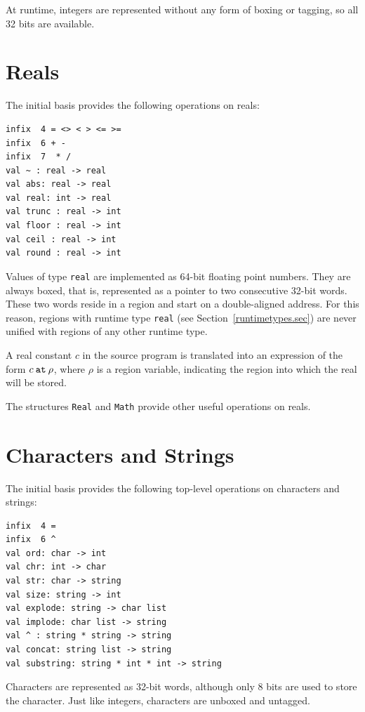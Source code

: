 \documentclass[12pt]{book}
\begin{document}
At runtime, integers are represented without any form of boxing or tagging, so
all 32 bits are available. 

\section{Reals}
The initial basis provides the following operations on reals:
\index{{\tt =}}\index{{\tt <>}}\index{{\tt <}}\index{{\tt >}}\index{{\tt <=}}\index{{\tt >=}}\index{{\tt +}}\index{{\tt -}}\index{{\tt *}}\index{{\tt /}}\index{\verb+~+}
\begin{verbatim}
infix  4 = <> < > <= >= 
infix  6 + - 
infix  7  * /
val ~ : real -> real
val abs: real -> real
val real: int -> real
val trunc : real -> int
val floor : real -> int
val ceil : real -> int
val round : real -> int
\end{verbatim}
Values of type {\tt real} are implemented as 64-bit floating point
numbers.  They are always boxed, that is, represented as a pointer to
two consecutive 32-bit words.  These two words reside
in a region and start on a double-aligned address. For this reason,
regions with runtime type {\tt real} (see
Section~\ref{runtimetypes.sec}) are never unified with regions of any
other runtime type.

A real constant $c$ in the source program is translated into an
expression of the form $c\mathbin{\hbox{\tt at}}\rho$, where $\rho$ is
a region variable, indicating the region into which the real will be
stored.

The structures {\tt Real} and {\tt Math} provide other useful
operations on reals.

\section{Characters and Strings}
The initial basis provides the following top-level operations on characters and strings:\index{{\tt =}}\index{\verb+^+}
\begin{verbatim}
infix  4 = 
infix  6 ^
val ord: char -> int
val chr: int -> char
val str: char -> string
val size: string -> int
val explode: string -> char list
val implode: char list -> string
val ^ : string * string -> string
val concat: string list -> string
val substring: string * int * int -> string
\end{verbatim}
Characters are represented as 32-bit words, although only 8 bits are
used to store the character. Just like integers, characters are
unboxed and untagged.
\end{document}
